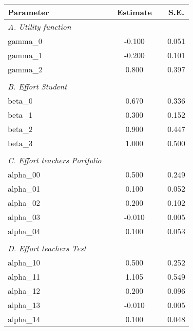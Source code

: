 \begin{tabular}{lcccc}
\hline
Parameter &  & Estimate & & S.E. \bigstrut\\
\hline
\emph{A. Utility function} &       &       &       &  \\
gamma_0 &  &  -0.100 &  & 0.051 \\
gamma_1 &  &  -0.200 &  & 0.101 \\
gamma_2 &  &  0.800 &  & 0.397 \\
 &       &       &       &  \\
\emph{B. Effort Student} &       &       &       &  \\
beta_0 &  &  0.670 &  & 0.336 \\
beta_1 &  &  0.300 &  & 0.152 \\
beta_2 &  &  0.900 &  & 0.447 \\
beta_3 &  &  1.000 &  & 0.500 \\
 &       &       &       &  \\
\emph{C. Effort teachers Portfolio} &       &       &       &  \\
alpha_00 &  &  0.500 &  & 0.249 \\
alpha_01 &  &  0.100 &  & 0.052 \\
alpha_02 &  &  0.200 &  & 0.102 \\
alpha_03 &  &  -0.010 &  & 0.005 \\
alpha_04 &  &  0.100 &  & 0.053 \\
 &       &       &       &  \\
\emph{D. Effort teachers Test} &       &       &       &  \\
alpha_10 &  &  0.500 &  & 0.252 \\
alpha_11 &  &  1.105 &  & 0.549 \\
alpha_12 &  &  0.200 &  & 0.096 \\
alpha_13 &  &  -0.010 &  & 0.005 \\
alpha_14 &  &  0.100 &  & 0.048 \\
\hline
\end{tabular}
